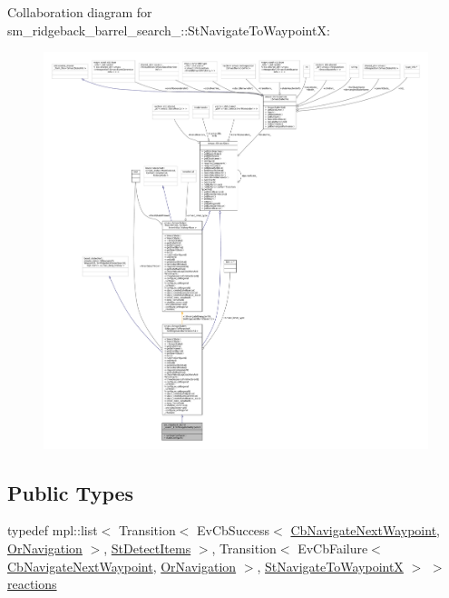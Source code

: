 Collaboration diagram for sm\+\_\+ridgeback\+\_\+barrel\+\_\+search\+\_\+:\+:St\+Navigate\+To\+WaypointX\+:
\nopagebreak
\begin{figure}[H]
\begin{center}
\leavevmode
\includegraphics[width=350pt]{structsm__ridgeback__barrel__search__1_1_1StNavigateToWaypointX__coll__graph}
\end{center}
\end{figure}
\subsection*{Public Types}
\begin{DoxyCompactItemize}
\item 
typedef mpl\+::list$<$ Transition$<$ Ev\+Cb\+Success$<$ \hyperlink{classcl__move__base__z_1_1CbNavigateNextWaypoint}{Cb\+Navigate\+Next\+Waypoint}, \hyperlink{classsm__ridgeback__barrel__search__1_1_1OrNavigation}{Or\+Navigation} $>$, \hyperlink{structsm__ridgeback__barrel__search__1_1_1StDetectItems}{St\+Detect\+Items} $>$, Transition$<$ Ev\+Cb\+Failure$<$ \hyperlink{classcl__move__base__z_1_1CbNavigateNextWaypoint}{Cb\+Navigate\+Next\+Waypoint}, \hyperlink{classsm__ridgeback__barrel__search__1_1_1OrNavigation}{Or\+Navigation} $>$, \hyperlink{structsm__ridgeback__barrel__search__1_1_1StNavigateToWaypointX}{St\+Navigate\+To\+WaypointX} $>$ $>$ \hyperlink{structsm__ridgeback__barrel__search__1_1_1StNavigateToWaypointX_a7ccc105112324fc07f3a0d3a4acbbfec}{reactions}
\end{DoxyCompactItemize}
